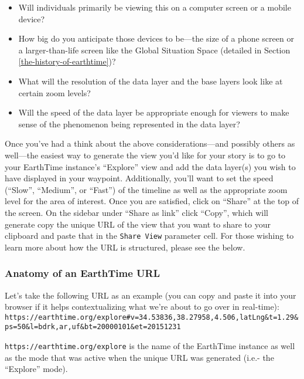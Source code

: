 \documentclass[
]{book}
\providecommand{\tightlist}{%
  \setlength{\itemsep}{0pt}\setlength{\parskip}{0pt}}
\begin{document}
\begin{itemize}
\tightlist
\item
  Will individuals primarily be viewing this on a computer screen or a mobile device?
\item
  How big do you anticipate those devices to be---the size of a phone screen or a larger-than-life screen like the Global Situation Space (detailed in Section \ref{the-history-of-earthtime})?
\item
  What will the resolution of the data layer and the base layers look like at certain zoom levels?
\item
  Will the speed of the data layer be appropriate enough for viewers to make sense of the phenomenon being represented in the data layer?
\end{itemize}

Once you've had a think about the above considerations---and possibly others as well---the easiest way to generate the view you'd like for your story is to go to your EarthTime instance's ``Explore'' view and add the data layer(s) you wish to have displayed in your waypoint. Additionally, you'll want to set the speed (``Slow'', ``Medium'', or ``Fast'') of the timeline as well as the appropriate zoom level for the area of interest. Once you are satisfied, click on ``Share'' at the top of the screen. On the sidebar under ``Share as link'' click ``Copy'', which will generate copy the unique URL of the view that you want to share to your clipboard and paste that in the \texttt{Share\ View} parameter cell. For those wishing to learn more about how the URL is structured, please see the below.

\hypertarget{anatomy-of-an-earthtime-url}{%
\subsubsection*{Anatomy of an EarthTime URL}\label{anatomy-of-an-earthtime-url}}


Let's take the following URL as an example (you can copy and paste it into your browser if it helps contextualizing what we're about to go over in real-time): \texttt{https://earthtime.org/explore\#v=34.53836,38.27958,4.506,latLng\&t=1.29\&ps=50\&l=bdrk,ar,uf\&bt=20000101\&et=20151231}

\texttt{https://earthtime.org/explore} is the name of the EarthTime instance as well as the mode that was active when the unique URL was generated (i.e.- the ``Explore'' mode).
\end{document}
